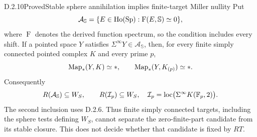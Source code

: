 \begin{claim}{D.2.10}{Proved}{Stable sphere annihilation implies finite-target Miller nullity}
Put
\[
 \mathcal A_{\mathbb S}
 =\{E\in\operatorname{Ho}(\mathrm{Sp}):\operatorname{F}(E,\mathbb S)\simeq0\},
\]
where $\operatorname{F}$ denotes the derived function spectrum, so the
condition includes every shift. If a pointed space $Y$ satisfies
$\Sigma^\infty Y\in\mathcal A_{\mathbb S}$, then, for every finite simply
connected pointed complex $K$ and every prime $p$,
\[
 \operatorname{Map}_*(Y,K)\simeq *,\qquad \operatorname{Map}_*(Y,K_{(p)})\simeq *.
\]
Consequently
\[
 R(\mathcal A_{\mathbb S})\subseteq W_S,
 \qquad R(\mathcal I_p)\subseteq W_S,
 \quad \mathcal I_p=\operatorname{loc}\bigl(\Sigma^\infty K(\mathbb F_p,2)\bigr).
\]
The second inclusion uses D.2.6. Thus finite simply connected targets,
including the sphere tests defining $W_S$, cannot separate the
zero-finite-part candidate from its stable closure. This does not decide
whether that candidate is fixed by $RT$.
\end{claim}
